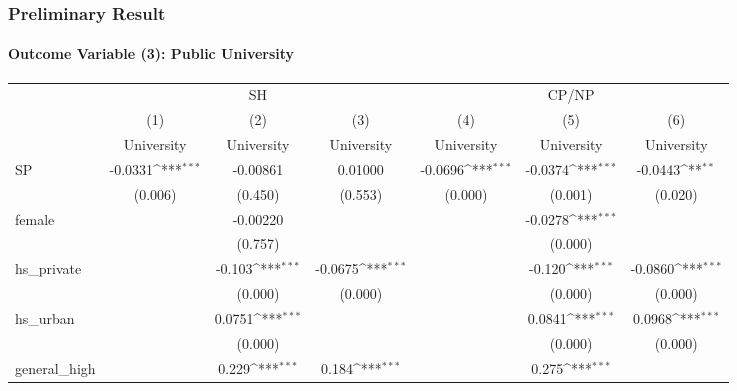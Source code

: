 \documentclass{beamer}
\def\sym#1{\ifmmode^{#1}\else\(^{#1}\)\fi}
\begin{document}
\begin{frame}[shrink=38] %
\frametitle{Preliminary Result}
\framesubtitle{Outcome Variable (3): Public University}

\centering
\begin{tabular}{l*{6}c}
    \toprule
    &\multicolumn{3}{c}{SH} &\multicolumn{3}{c}{CP/NP} \\
    \cmidrule(l){2-4}\cmidrule(l){5-7}
    &\multicolumn{1}{c}{(1)}&\multicolumn{1}{c}{(2)}&\multicolumn{1}{c}{(3)}&\multicolumn{1}{c}{(4)}&\multicolumn{1}{c}{(5)}&\multicolumn{1}{c}{(6)} \\
    &\multicolumn{1}{c}{University}&\multicolumn{1}{c}{University}&\multicolumn{1}{c}{University}&\multicolumn{1}{c}{University}&\multicolumn{1}{c}{University}&\multicolumn{1}{c}{University} \\
    \midrule
    SP          &     -0.0331\sym{***}&    -0.00861         &     0.01000         &     -0.0696\sym{***}&     -0.0374\sym{***}&     -0.0443\sym{**} \\
                &     (0.006)         &     (0.450)         &     (0.553)         &     (0.000)         &     (0.001)         &     (0.020)         \\
    [1em]
    female      &                     &    -0.00220         &                     &                     &     -0.0278\sym{***}&                     \\
                &                     &     (0.757)         &                     &                     &     (0.000)         &                     \\
    [1em]
    hs\_private  &                     &      -0.103\sym{***}&     -0.0675\sym{***}&                     &      -0.120\sym{***}&     -0.0860\sym{***}\\
                &                     &     (0.000)         &     (0.000)         &                     &     (0.000)         &     (0.000)         \\
    [1em]
    hs\_urban    &                     &      0.0751\sym{***}&                     &                     &      0.0841\sym{***}&      0.0968\sym{***}\\
                &                     &     (0.000)         &                     &                     &     (0.000)         &     (0.000)         \\
    [1em]
    general\_high&                     &       0.229\sym{***}&       0.184\sym{***}&                     &       0.275\sym{***}&                     \\

\end{tabular}
\end{frame}
\end{document}
